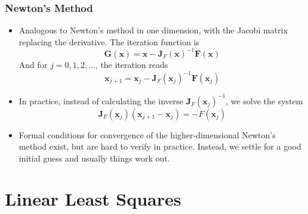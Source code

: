 \documentclass[11pt, a4paper]{article}
\newcommand{\mat}[1]{\mathbf{#1}} %
\begin{document}
\subsubsection{Newton's Method}
\begin{itemize}
	\item Analogous to Newton's method in one dimension, with the Jacobi matrix replacing the derivative. The iteration function is
	\begin{equation*}
		\bm{G}(\bm{x}) = \bm{x} - \mat{J}_{F}(\bm{x})^{-1} \bm{F}(\bm{x})
	\end{equation*}
	And for $ j = 0, 1, 2, \ldots $, the iteration reads
	\begin{equation*}
		\bm{x}_{j+1} = \bm{x}_{j} - \mat{J}_{F}(\bm{x}_{j})^{-1} \bm{F}(\bm{x}_{j})
	\end{equation*}
	
	\item In practice, instead of calculating the inverse $ \mat{J}_{F}(\bm{x}_{j})^{-1} $, we solve the system 
	\begin{equation*}
		\mat{J}_{F}(\bm{x}_{j}) (\bm{x}_{j+1} - \bm{x}_{j}) = - F(\bm{x}_{j})
	\end{equation*}
	
	\item Formal conditions for convergence of the higher-dimensional Newton's method exist, but are hard to verify in practice. Instead, we settle for a good initial guess and usually things work out.
\end{itemize}


\section{Linear Least Squares}
\end{document}
